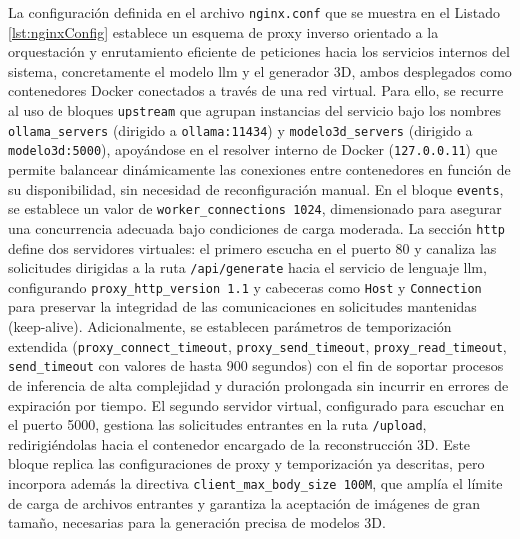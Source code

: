 La configuración definida en el archivo \verb|nginx.conf| que se muestra en el Listado \ref{lst:nginxConfig} establece un esquema de proxy inverso orientado a la orquestación y enrutamiento eficiente de peticiones hacia los servicios internos del sistema, concretamente el modelo \gls{llm} y el generador 3D, ambos desplegados como contenedores Docker conectados a través de una red virtual. Para ello, se recurre al uso de bloques \verb|upstream| que agrupan instancias del servicio bajo los nombres \verb|ollama_servers| (dirigido a \verb|ollama:11434|) y \verb|modelo3d_servers| (dirigido a \verb|modelo3d:5000|), apoyándose en el resolver interno de Docker (\verb|127.0.0.11|) que permite balancear dinámicamente las conexiones entre contenedores en función de su disponibilidad, sin necesidad de reconfiguración manual. En el bloque \verb|events|, se establece un valor de \verb|worker_connections 1024|, dimensionado para asegurar una concurrencia adecuada bajo condiciones de carga moderada. La sección \verb|http| define dos servidores virtuales: el primero escucha en el puerto 80 y canaliza las solicitudes dirigidas a la ruta \verb|/api/generate| hacia el servicio de lenguaje \gls{llm}, configurando \verb|proxy_http_version 1.1| y cabeceras como \verb|Host| y \verb|Connection| para preservar la integridad de las comunicaciones en solicitudes mantenidas (keep-alive). Adicionalmente, se establecen parámetros de temporización extendida (\verb|proxy_connect_timeout|, \verb|proxy_send_timeout|, \verb|proxy_read_timeout|, \verb|send_timeout| con valores de hasta 900 segundos) con el fin de soportar procesos de inferencia de alta complejidad y duración prolongada sin incurrir en errores de expiración por tiempo. El segundo servidor virtual, configurado para escuchar en el puerto 5000, gestiona las solicitudes entrantes en la ruta \verb|/upload|, redirigiéndolas hacia el contenedor encargado de la reconstrucción 3D. Este bloque replica las configuraciones de proxy y temporización ya descritas, pero incorpora además la directiva \verb|client_max_body_size 100M|, que amplía el límite de carga de archivos entrantes y garantiza la aceptación de imágenes de gran tamaño, necesarias para la generación precisa de modelos 3D.


